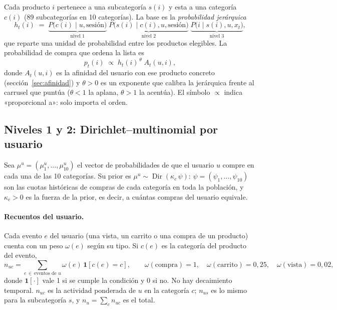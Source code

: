 \documentclass[11pt,a4paper]{article}
\newcommand{\Dir}{\operatorname{Dir}}
\begin{document}
Cada producto $i$ pertenece a una subcategoría $s(i)$ y esta a una categoría $c(i)$ (89 subcategorías
en 10 categorías). La base es la \emph{probabilidad jerárquica}
\begin{equation}
h_t(i)\;=\;
\underbrace{P\big(c(i)\mid u,\text{sesión}\big)}_{\text{nivel 1}}\;
\underbrace{P\big(s(i)\mid c(i),u,\text{sesión}\big)}_{\text{nivel 2}}\;
\underbrace{P\big(i\mid s(i),u,x_t\big)}_{\text{nivel 3}} , \label{eq:factor}
\end{equation}
que reparte una unidad de probabilidad entre los productos elegibles. La probabilidad de compra que
ordena la lista es
\begin{equation}
p_t(i)\;\propto\;h_t(i)^{\,\theta}\;A_t(u,i), \label{eq:score}
\end{equation}
donde $A_t(u,i)$ es la afinidad del usuario con ese producto concreto (sección~\ref{sec:afinidad}) y
$\theta>0$ es un exponente que calibra la jerárquica frente al carrusel que puntúa ($\theta<1$ la aplana,
$\theta>1$ la acentúa). El símbolo $\propto$ indica «proporcional a»: solo importa el orden.

\subsection{Niveles 1 y 2: Dirichlet--multinomial por usuario}

Sea $\mu^u=(\mu^u_1,\dots,\mu^u_{10})$ el vector de probabilidades de que el usuario $u$ compre en cada
una de las 10 categorías. Su prior es $\mu^u\sim\Dir(\kappa_c\,\psi)$: $\psi=(\psi_1,\dots,\psi_{10})$ son
las cuotas históricas de compras de cada categoría en toda la población, y $\kappa_c>0$ es la fuerza de
la prior, es decir, a cuántas compras del usuario equivale.

\paragraph{Recuentos del usuario.} Cada evento $e$ del usuario (una vista, un carrito o una compra de
un producto) cuenta con un peso $\omega(e)$ según su tipo. Si $c(e)$ es la categoría del producto del
evento,
\[
n_{uc}=\sum_{e\,\in\,\text{eventos de }u}\omega(e)\,\mathbf 1[c(e)=c],\qquad
\omega(\text{compra})=1,\quad \omega(\text{carrito})=0{,}25,\quad \omega(\text{vista})=0{,}02 ,
\]
donde $\mathbf 1[\cdot]$ vale 1 si se cumple la condición y 0 si no. No hay decaimiento temporal.
$n_{uc}$ es la actividad ponderada de $u$ en la categoría $c$; $n_{us}$ es lo mismo para la subcategoría
$s$, y $n_u=\sum_c n_{uc}$ es el total.
\end{document}
